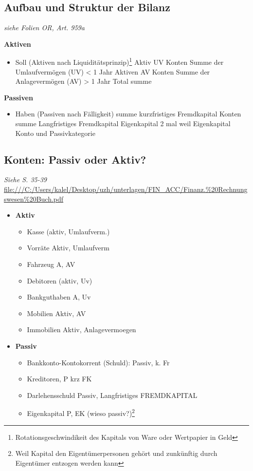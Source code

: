 \subsection{Aufbau und Struktur der Bilanz } 
\textit{siehe Folien OR, Art. 959a}

\textbf{Aktiven}
\begin{itemize}
    \item Soll (Aktiven nach Liquiditätsprinzip)\footnote{Rotationsgeschwindikeit des Kapitals von Ware oder Wertpapier in Geld}
        \subitem Aktiv UV Konten 
        \subitem Summe der Umlaufvermögen (UV) < 1 Jahr
        \subitem Aktiven AV Konten
        \subitem Summe der Anlagevermögen (AV) > 1 Jahr
        \subitem Total summe
\end{itemize}
\textbf{Passiven}
\begin{itemize}
    \item Haben (Passiven nach Fälligkeit)
        \subitem summe kurzfristiges Fremdkapital Konten 
        \subitem summe Langfristiges Fremdkapital
        \subitem Eigenkapital 2 mal weil Eigenkapital Konto und Passivkategorie 
\end{itemize}



\subsection{ Konten: Passiv oder Aktiv?}
\textit{Siehe S. 35-39} \url{file:///C:/Users/kalel/Desktop/uzh/unterlagen/FIN_ACC/Finanz.%20Rechnungswesen%20Buch.pdf} 
\begin{itemize}
    \item \textbf{Aktiv}
    \begin{itemize}
        \item Kasse (aktiv, Umlaufverm.)
        \item Vorräte Aktiv, Umlaufverm
        \item Fahrzeug A, AV
        \item Debitoren (aktiv, Uv)
        \item Bankguthaben A, Uv
        
        \item Mobilien Aktiv, AV
        \item Immobilien Aktiv, Anlagevermoegen
    \end{itemize}
    \item \textbf{Passiv}
    \begin{itemize}
        \item Bankkonto-Kontokorrent (Schuld): Passiv, k. Fr
        \item Kreditoren, P krz FK 
        \item Darlehensschuld Passiv, Langfristiges FREMDKAPITAL
        \item Eigenkapital P, EK (wieso passiv?)\footnote{Weil Kapital den Eigentümerpersonen gehört und zunkünftig durch Eigentümer entzogen werden kann}
    \end{itemize}
\end{itemize}

